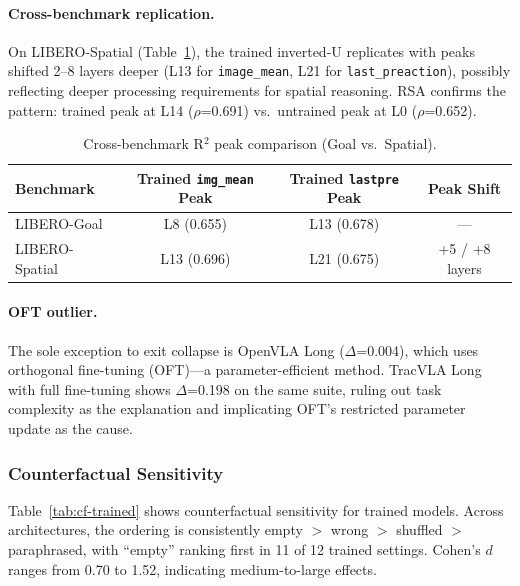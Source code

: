 \documentclass[letterpaper]{article}
\begin{document}
\paragraph{Cross-benchmark replication.}
On LIBERO-Spatial (Table~\ref{tab:cross-benchmark}), the trained inverted-U replicates with peaks shifted 2--8 layers deeper (L13 for \texttt{image\_mean}, L21 for \texttt{last\_preaction}), possibly reflecting deeper processing requirements for spatial reasoning.
RSA confirms the pattern: trained peak at L14 ($\rho$=0.691) vs.\ untrained peak at L0 ($\rho$=0.652).

\begin{table}[t]
\centering
\caption{Cross-benchmark R$^2$ peak comparison (Goal vs.\ Spatial).}
\label{tab:cross-benchmark}
\small
\begin{tabular}{lccc}
\toprule
Benchmark & Trained \texttt{img\_mean} Peak & Trained \texttt{lastpre} Peak & Peak Shift \\
\midrule
LIBERO-Goal    & L8 (0.655) & L13 (0.678) & --- \\
LIBERO-Spatial & L13 (0.696) & L21 (0.675) & +5 / +8 layers \\
\bottomrule
\end{tabular}
\end{table}

\paragraph{OFT outlier.}
The sole exception to exit collapse is OpenVLA Long ($\Delta$=0.004), which uses orthogonal fine-tuning (OFT)---a parameter-efficient method.
TracVLA Long with full fine-tuning shows $\Delta$=0.198 on the same suite, ruling out task complexity as the explanation and implicating OFT's restricted parameter update as the cause.

\subsubsection{Counterfactual Sensitivity}
\label{sec:cf}

Table~\ref{tab:cf-trained} shows counterfactual sensitivity for trained models.
Across architectures, the ordering is consistently empty $>$ wrong $>$ shuffled $>$ paraphrased, with ``empty'' ranking first in 11 of 12 trained settings.
Cohen's $d$ ranges from 0.70 to 1.52, indicating medium-to-large effects.
\end{document}
